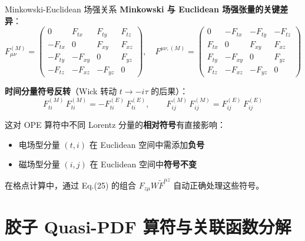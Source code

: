 \documentclass[10pt,aspectratio=169]{beamer}
\begin{document}
\begin{frame}{Minkowski-Euclidean 场强关系}
\small
\textbf{Minkowski 与 Euclidean 场强张量的关键差异}：
\begin{equation}
  F^{(M)}_{\mu\nu} = \begin{pmatrix}
    0 & F_{tx} & F_{ty} & F_{tz} \\
    -F_{tx} & 0 & F_{xy} & F_{xz} \\
    -F_{ty} & -F_{xy} & 0 & F_{yz} \\
    -F_{tz} & -F_{xz} & -F_{yz} & 0
  \end{pmatrix},\quad
  F^{\mu\nu,(M)} = \begin{pmatrix}
    0 & -F_{tx} & -F_{ty} & -F_{tz} \\
    F_{tx} & 0 & F_{xy} & F_{xz} \\
    F_{ty} & -F_{xy} & 0 & F_{yz} \\
    F_{tz} & -F_{xz} & -F_{yz} & 0
  \end{pmatrix}
\end{equation}

\textbf{时间分量符号反转}（Wick 转动 $t \to -i\tau$ 的后果）：
\begin{equation}
  \boxed{
  F^{(M)}_{ti}\,F^{(M)}_{ti} = -F^{(E)}_{ti}\,F^{(E)}_{ti},\qquad
  F^{(M)}_{ij}\,F^{(M)}_{ij} = F^{(E)}_{ij}\,F^{(E)}_{ij}
  }
\end{equation}

这对 OPE 算符中不同 Lorentz 分量的\textbf{相对符号}有直接影响：

\begin{itemize}
  \item 电场型分量 $(t,i)$ 在 Euclidean 空间中需添加\textbf{负号}
  \item 磁场型分量 $(i,j)$ 在 Euclidean 空间中\textbf{符号不变}
\end{itemize}

在格点计算中，通过 Eq.(25) 的组合 $F_{z\mu}W\tilde{F}^{\mu z}$ 自动正确处理这些符号。
\end{frame}

\section{胶子 Quasi-PDF 算符与关联函数分解}
\end{document}
